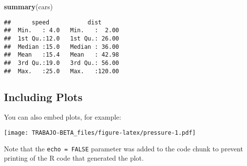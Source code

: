 \documentclass[
]{article}
\newenvironment{Shaded}{\begin{snugshade}}{\end{snugshade}}
\newcommand{\KeywordTok}[1]{\textcolor[rgb]{0.13,0.29,0.53}{\textbf{#1}}}
\newcommand{\NormalTok}[1]{#1}
\begin{document}
\begin{Shaded}
\begin{Highlighting}[]
\KeywordTok{summary}\NormalTok{(cars)}
\end{Highlighting}
\end{Shaded}

\begin{verbatim}
##      speed           dist       
##  Min.   : 4.0   Min.   :  2.00  
##  1st Qu.:12.0   1st Qu.: 26.00  
##  Median :15.0   Median : 36.00  
##  Mean   :15.4   Mean   : 42.98  
##  3rd Qu.:19.0   3rd Qu.: 56.00  
##  Max.   :25.0   Max.   :120.00
\end{verbatim}

\hypertarget{including-plots}{%
\subsection{Including Plots}\label{including-plots}}

You can also embed plots, for example:

\texttt{[image: TRABAJO-BETA\_files/figure-latex/pressure-1.pdf]}

Note that the \texttt{echo\ =\ FALSE} parameter was added to the code
chunk to prevent printing of the R code that generated the plot.
\end{document}
